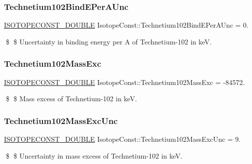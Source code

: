 \subsubsection{\texorpdfstring{Technetium102\+Bind\+E\+Per\+A\+Unc}{Technetium102BindEPerAUnc}}
{\footnotesize\ttfamily \mbox{\hyperlink{group___isotope_const-_macros_ga8f45a7272ce02c0b4c65c44636ed719a}{I\+S\+O\+T\+O\+P\+E\+C\+O\+N\+S\+T\+\_\+\+D\+O\+U\+B\+LE}} Isotope\+Const\+::\+Technetium102\+Bind\+E\+Per\+A\+Unc = 0.}

\$ \$ Uncertainty in binding energy per A of Technetium-\/102 in keV. \mbox{\label{group___isotope_const-_technetium-_tc102_ga883e3044f20653285ab3f20e1bcb4bf0}} 
\subsubsection{\texorpdfstring{Technetium102\+Mass\+Exc}{Technetium102MassExc}}
{\footnotesize\ttfamily \mbox{\hyperlink{group___isotope_const-_macros_ga8f45a7272ce02c0b4c65c44636ed719a}{I\+S\+O\+T\+O\+P\+E\+C\+O\+N\+S\+T\+\_\+\+D\+O\+U\+B\+LE}} Isotope\+Const\+::\+Technetium102\+Mass\+Exc = -\/84572.}

\$ \$ Mass excess of Technetium-\/102 in keV. \mbox{\label{group___isotope_const-_technetium-_tc102_gadd7a0619b7ad38c081125095e1e59e2f}} 
\subsubsection{\texorpdfstring{Technetium102\+Mass\+Exc\+Unc}{Technetium102MassExcUnc}}
{\footnotesize\ttfamily \mbox{\hyperlink{group___isotope_const-_macros_ga8f45a7272ce02c0b4c65c44636ed719a}{I\+S\+O\+T\+O\+P\+E\+C\+O\+N\+S\+T\+\_\+\+D\+O\+U\+B\+LE}} Isotope\+Const\+::\+Technetium102\+Mass\+Exc\+Unc = 9.}

\$ \$ Uncertainty in mass excess of Technetium-\/102 in keV. \mbox{\label{group___isotope_const-_technetium-_tc102_ga271cad279b449aa45f7625dc1ae2fcb6}} 
